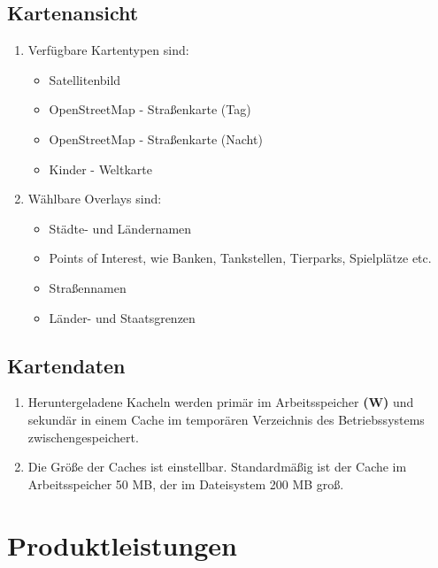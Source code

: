 \documentclass[10pt]{scrreprt}
\begin{document}
\section{Kartenansicht}
\begin{enumerate}[leftmargin=2cm]
\item Verfügbare Kartentypen sind:
\begin{itemize}
\item Satellitenbild
\item OpenStreetMap - Straßenkarte (Tag)
\item OpenStreetMap - Straßenkarte (Nacht)
\item Kinder - Weltkarte
\end{itemize}
\item Wählbare Overlays sind:
\begin{itemize}
\item Städte- und Ländernamen
\item Points of Interest, wie Banken, Tankstellen, Tierparks, Spielplätze etc.
\item Straßennamen
\item Länder- und Staatsgrenzen
\end{itemize}
\end{enumerate}
\section{Kartendaten}
\begin{enumerate}[leftmargin=2cm,resume]
\item Heruntergeladene Kacheln werden primär im Arbeitsspeicher \textbf{(W)} und sekundär in einem Cache im temporären Verzeichnis des Betriebssystems zwischengespeichert.
\item Die Größe der Caches ist einstellbar. Standardmäßig ist der Cache im Arbeitsspeicher 50 MB, der im Dateisystem 200 MB groß.
\end{enumerate}




\chapter{Produktleistungen}

\renewcommand{\labelenumi}{\textbf{/L\numprint{\theenumi}0/}}
\end{document}
